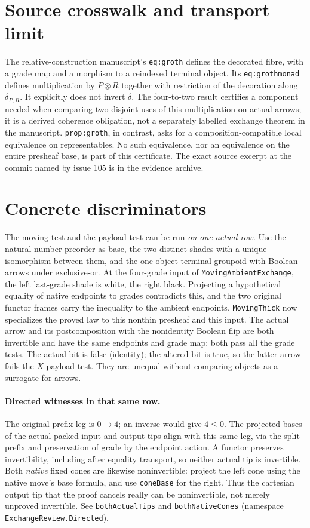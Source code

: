 \documentclass[11pt]{article}
\newcommand{\nm}[1]{\nolinkurl{#1}}
\begin{document}
\section*{Source crosswalk and transport limit}
The relative-construction manuscript's \nm{eq:groth} defines the decorated fibre, with a grade map and a morphism to a reindexed terminal object. Its \nm{eq:grothmonad} defines multiplication by $P\otimes R$ together with restriction of the decoration along $\delta_{P,R}$. It explicitly does not invert $\delta$. The four-to-two result certifies a component needed when comparing two disjoint uses of this multiplication on actual arrows; it is a derived coherence obligation, not a separately labelled exchange theorem in the manuscript. \nm{prop:groth}, in contrast, asks for a composition-compatible local equivalence on representables. No such equivalence, nor an equivalence on the entire presheaf base, is part of this certificate. The exact source excerpt at the commit named by issue 105 is in the evidence archive.
\section*{Concrete discriminators}
The moving test and the payload test can be run \emph{on one actual row}. Use the natural-number preorder as base, the two distinct shades with a unique isomorphism between them, and the one-object terminal groupoid with Boolean arrows under exclusive-or. At the four-grade input of \nm{MovingAmbientExchange}, the left last-grade shade is white, the right black. Projecting a hypothetical equality of native endpoints to grades contradicts this, and the two original functor frames carry the inequality to the ambient endpoints. \nm{MovingThick} now specializes the proved law to this nonthin presheaf and this input. The actual arrow and its postcomposition with the nonidentity Boolean flip are both invertible and have the same endpoints and grade map: both pass all the grade tests. The actual bit is false (identity); the altered bit is true, so the latter arrow fails the $X$-payload test. They are unequal without comparing objects as a surrogate for arrows.
\paragraph{Directed witnesses in that same row.}
The original prefix leg is $0\to4$; an inverse would give $4\le0$. The projected bases of the actual packed input and output tips align with this same leg, via the split prefix and preservation of grade by the endpoint action. A functor preserves invertibility, including after equality transport, so neither actual tip is invertible. Both \emph{native} fixed cones are likewise noninvertible: project the left cone using the native move's base formula, and use \nm{coneBase} for the right. Thus the cartesian output tip that the proof cancels really can be noninvertible, not merely unproved invertible. See \nm{bothActualTips} and \nm{bothNativeCones} (namespace \nm{ExchangeReview.Directed}).
\end{document}
